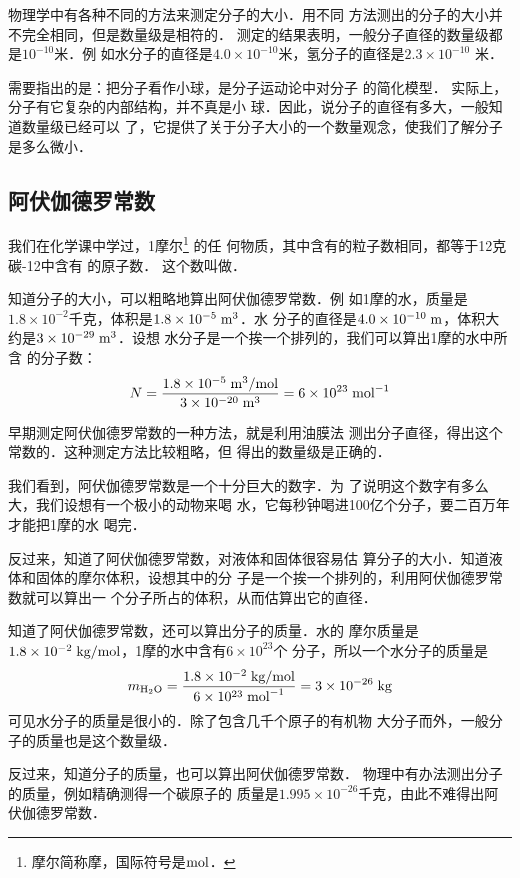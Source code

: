     物理学中有各种不同的方法来测定分子的大小．用不同
方法测出的分子的大小并不完全相同，但是数量级是相符的．
测定的结果表明，一般分子直径的数量级都是$10^{-10}$米．例
如水分子的直径是$4.0\times 10^{-10}$米，氢分子的直径是$2.3\times 10^{-10}$
米．

    需要指出的是：把分子看作小球，是分子运动论中对分子
的简化模型．
实际上，分子有它复杂的内部结构，并不真是小
球．因此，说分子的直径有多大，一般知道数量级已经可以
了，它提供了关于分子大小的一个数量观念，使我们了解分子
是多么微小．

\subsection{阿伏伽德罗常数}

我们在化学课中学过，1摩尔\footnote{摩尔简称摩，国际符号是$\text{mol}$．}
的任
何物质，其中含有的粒子数相同，都等于12克碳-12中含有
的原子数．
这个数叫做．

    知道分子的大小，可以粗略地算出阿伏伽德罗常数．例
如1摩的水，质量是$1.8\times 10^{-2}$千克，体积是$1.8\times 10^{-5} \;\text{m}^3 $．水
分子的直径是$4.0\times 10^{-10} \;\text{m} $，体积大约是$3\times 10^{-29} \;\text{m}^3 $．设想
水分子是一个挨一个排列的，我们可以算出1摩的水中所含
的分子数：
\[N=\frac{1.8\times 10^{-5} \;\text{m}^3/\text{mol} }{3\times 10^{-20} \;\text{m}^3 }=6\times 10^{23} \;\text{mol}^{-1} \]

    早期测定阿伏伽德罗常数的一种方法，就是利用油膜法
测出分子直径，得出这个常数的．这种测定方法比较粗略，但
得出的数量级是正确的．

    我们看到，阿伏伽德罗常数是一个十分巨大的数字．为
了说明这个数字有多么大，我们设想有一个极小的动物来喝
水，它每秒钟喝进100亿个分子，要二百万年才能把1摩的水
喝完．

    反过来，知道了阿伏伽德罗常数，对液体和固体很容易估
算分子的大小．知道液体和固体的摩尔体积，设想其中的分
子是一个挨一个排列的，利用阿伏伽德罗常数就可以算出一
个分子所占的体积，从而估算出它的直径．

    知道了阿伏伽德罗常数，还可以算出分子的质量．水的
摩尔质量是$1.8\times 10^{-2} \;\text{kg}/\text{mol} $，1摩的水中含有$6\times 10^{23}$个
分子，所以一个水分子的质量是
\[m_{\rm H_2 O}=\frac{1.8\times 10^{-2}  \;\text{kg}/\text{mol} }{6\times 10^{23} \;\text{mol}^{-1} }=3\times 10^{-26} \;\text{kg} \]
可见水分子的质量是很小的．除了包含几千个原子的有机物
大分子而外，一般分子的质量也是这个数量级．

    反过来，知道分子的质量，也可以算出阿伏伽德罗常数．
物理中有办法测出分子的质量，例如精确测得一个碳原子的
质量是$1.995\times 10^{-26}$千克，由此不难得出阿伏伽德罗常数．

